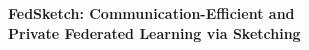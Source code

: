 \documentclass[article]{article}
\begin{document}
\begin{center}

{\bf{\LARGE{FedSketch: Communication-Efficient and \\
\vspace*{.2in}
Private Federated Learning via Sketching}}}
\vspace*{.2in}

{{
}}


\vspace*{.2in}



{\large{
\begin{tabular}{c}
\end{tabular}
}}

\begin{tabular}{c}
\end{tabular}

\vspace*{.2in}


\date{\today}

\end{center}
\end{document}
